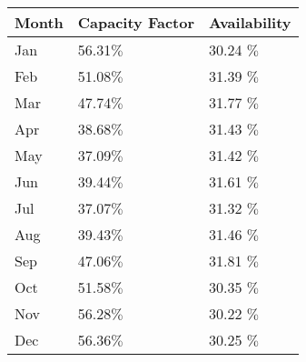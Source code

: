 \begin{tabular}{lll}
\toprule
Month & Capacity Factor & Availability \\
\midrule
  Jan &       56.31$\%$ &   30.24 $\%$ \\
  Feb &       51.08$\%$ &   31.39 $\%$ \\
  Mar &       47.74$\%$ &   31.77 $\%$ \\
  Apr &       38.68$\%$ &   31.43 $\%$ \\
  May &       37.09$\%$ &   31.42 $\%$ \\
  Jun &       39.44$\%$ &   31.61 $\%$ \\
  Jul &       37.07$\%$ &   31.32 $\%$ \\
  Aug &       39.43$\%$ &   31.46 $\%$ \\
  Sep &       47.06$\%$ &   31.81 $\%$ \\
  Oct &       51.58$\%$ &   30.35 $\%$ \\
  Nov &       56.28$\%$ &   30.22 $\%$ \\
  Dec &       56.36$\%$ &   30.25 $\%$ \\
\bottomrule
\end{tabular}
